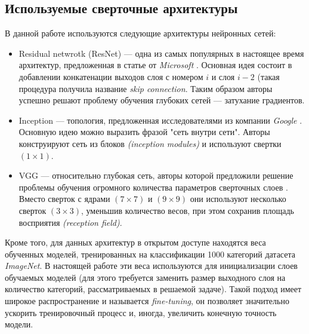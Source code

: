 \subsection{Используемые сверточные архитектуры}
\indent
\indent
В данной работе используются следующие архитектуры нейронных сетей:


\begin{itemize}

    \item Residual netwrotk (ResNet) ---
    одна из самых популярных в настоящее время архитектур,
    предложенная в статье от \textit{Microsoft} \cite{resnet}.
    Основная идея состоит в добавлении конкатенации выходов
    слоя с номером  $i$ и слоя $i - 2$ (такая процедура
    получила название \textit{skip connection}. Таким образом авторы
    успешно решают проблему 
    обучения глубоких сетей --- затухание градиентов.
    
    \item {Inception} --- топология, предложенная исследователями 
    из компании \textit{Google} \cite{inception}. Основную идею
    можно выразить фразой "сеть внутри сети". Авторы 
    конструируют сеть из блоков \textit{(inception modules)} и
    используют свертки $(1 \times 1)$.
    
    \item {VGG} --- относительно глубокая сеть, авторы которой предложили
    решение проблемы обучения огромного количества параметров
    сверточных слоев \cite{vgg}. Вместо сверток с ядрами $(7 \times 7)$ и
    $(9 \times 9)$ они используют несколько сверток $(3 \times 3)$, уменьшив
    количество весов, при этом сохранив 
    площадь восприятия \textit{(reception field)}.
    
\end{itemize}


\indent
\indent
Кроме того, для данных архитектур в открытом доступе находятся 
веса обученных моделей, тренированных на классификации 1000
категорий датасета \textit{ImageNet}\cite{imagenet}. В настоящей работе
эти веса используются для инициализации слоев обучаемых моделей
(для этого требуется заменить размер выходного слоя на количество
категорий, рассматриваемых в решаемой задаче).
Такой подход имеет широкое распространение 
и называется \textit{fine-tuning}, он позволяет значительно ускорить
тренировочный процесс и, иногда, увеличить конечную точность модели.